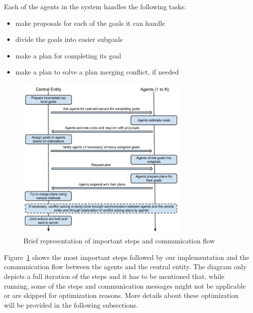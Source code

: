 Each of the agents in the system handles the following tasks:

\vspace{-12pt}
\begin{itemize}
\setlength{\itemsep}{0cm}
\item make proposals for each of the goals it can handle
\item divide the goals into easier subgoals
\item make a plan for completing its goal
\item make a plan to solve a plan merging conflict, if needed
\end{itemize}

\vspace{-0.3cm}
\begin{figure}[!htb]
\begin{center}
 \includegraphics[width=0.75\textwidth]{figures/communication_flow.png}
 \caption{Brief representation of important steps and communication flow}
 \label{fig:communication_flow}
\end{center}
\end{figure}

Figure~\ref{fig:communication_flow} shows the most important steps followed by our implementation and the
communication flow between the agents and the central entity. The diagram only depicts a full iteration of the
steps and it has to be mentioned that, while running, some of the steps and communication messages might not
be applicable or are skipped for optimization reasons. More details about these optimization will be provided
in the following subsections.


